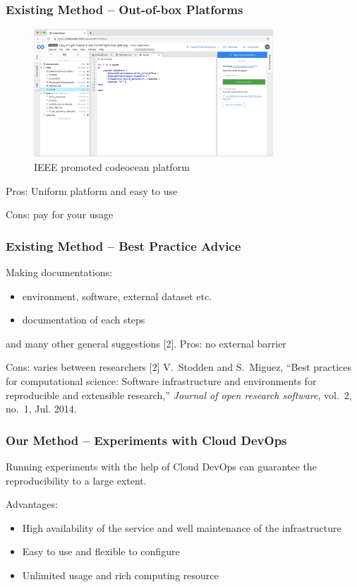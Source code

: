\documentclass[notheorems]{beamer}
\begin{document}
\begin{frame}
\frametitle{Existing Method -- Out-of-box Platforms}

\begin{figure}
\includegraphics[width=0.8\textwidth]{pic/code_ocean.jpeg}
\caption{IEEE promoted codeocean platform}
\end{figure}
Pros: Uniform platform and easy to use

Cons: pay for your usage
\end{frame}

\begin{frame}
\frametitle{Existing Method -- Best Practice Advice}

Making documentations:
\begin{itemize}
\item environment, software, external dataset etc.
\item documentation of each steps
\end{itemize}
and many other general suggestions [2].
\vskip 0.5cm
Pros: no external barrier

Cons: varies between researchers
\vskip 1cm
{\tiny
[2] V.~Stodden and S.~Miguez, ``Best practices for computational science: Software
  infrastructure and environments for reproducible and extensible research,''
  \emph{Journal of open research software}, vol.~2, no.~1, Jul. 2014.
  }
\end{frame}

\begin{frame}
\frametitle{Our Method -- Experiments with Cloud DevOps}
\begin{block}{}
\begin{centering}
Running experiments with the help of Cloud DevOps can guarantee the reproducibility to a large extent.
\end{centering}
\end{block}
Advantages:
\begin{itemize}
	\item High availability of the service and well maintenance of the infrastructure
	\item Easy to use and flexible to configure
	\item Unlimited usage and rich computing resource
\end{itemize}
\end{frame}
\end{document}
